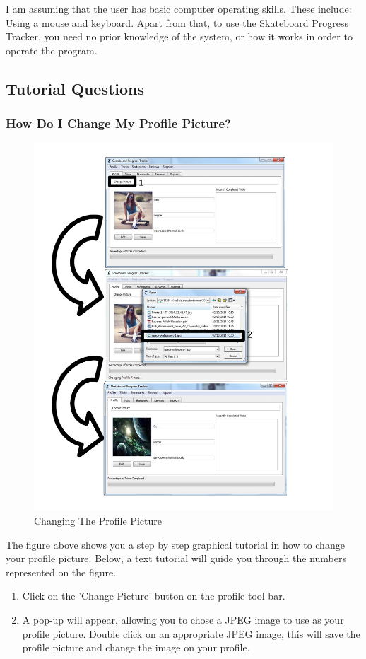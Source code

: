 I am assuming that the user has basic computer operating skills. These include: Using a mouse and keyboard. Apart from that, to use the Skateboard Progress Tracker, you need no prior knowledge of the system, or how it works in order to operate the program.

\subsection{Tutorial Questions}

\subsubsection{How Do I Change My Profile Picture?}

\begin{figure}[H]
    \includegraphics[width=\textwidth]{./Manual/Images/SaveProfilePicture.pdf}
    \caption{Changing The Profile Picture} \label{fig:Change Profile Picture}
\end{figure}

The figure above shows you a step by step graphical tutorial in how to change your profile picture. Below, a text tutorial will guide you through the numbers represented on the figure.
\begin{enumerate}
\item Click on the 'Change Picture' button on the profile tool bar.
\item A pop-up will appear, allowing you to chose a JPEG image to use as your profile picture. Double click on an appropriate JPEG image, this will save the profile picture and change the image on your profile.
\end{enumerate}


